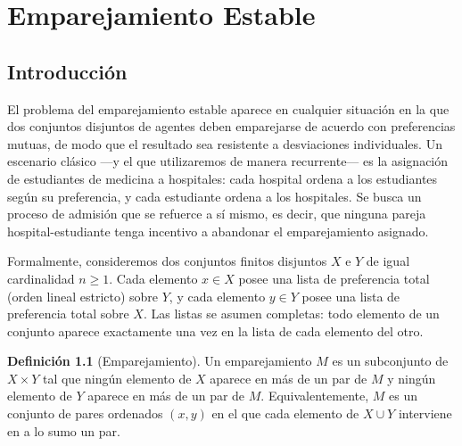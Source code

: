 \documentclass[12pt, spanish, oneside, openany]{book}
\theoremstyle{uprightplain}
\theoremstyle{definition}
\newtheorem{definicion}[teorema]{Definición}
\theoremstyle{remark}
\theoremstyle{definition}
\begin{document}
\pagestyle{fancy}

\chapter{Emparejamiento Estable}

\section{Introducción}

El problema del emparejamiento estable aparece en cualquier situación en la que dos conjuntos disjuntos de agentes deben emparejarse de acuerdo con preferencias mutuas, de modo que el resultado sea resistente a desviaciones individuales. Un escenario clásico ---y el que utilizaremos de manera recurrente--- es la asignación de estudiantes de medicina a hospitales: cada hospital ordena a los estudiantes según su preferencia, y cada estudiante ordena a los hospitales. Se busca un proceso de admisión que se refuerce a sí mismo, es decir, que ninguna pareja hospital-estudiante tenga incentivo a abandonar el emparejamiento asignado.

Formalmente, consideremos dos conjuntos finitos disjuntos $X$ e $Y$ de igual cardinalidad $n \ge 1$. Cada elemento $x \in X$ posee una lista de preferencia total (orden lineal estricto) sobre $Y$, y cada elemento $y \in Y$ posee una lista de preferencia total sobre $X$. Las listas se asumen completas: todo elemento de un conjunto aparece exactamente una vez en la lista de cada elemento del otro.

\begin{definicion}[Emparejamiento]
\label{def:emparejamiento}
Un emparejamiento $M$ es un subconjunto de $X \times Y$ tal que ningún elemento de $X$ aparece en más de un par de $M$ y ningún elemento de $Y$ aparece en más de un par de $M$. Equivalentemente, $M$ es un conjunto de pares ordenados $(x,y)$ en el que cada elemento de $X \cup Y$ interviene en a lo sumo un par.
\end{definicion}
\end{document}
